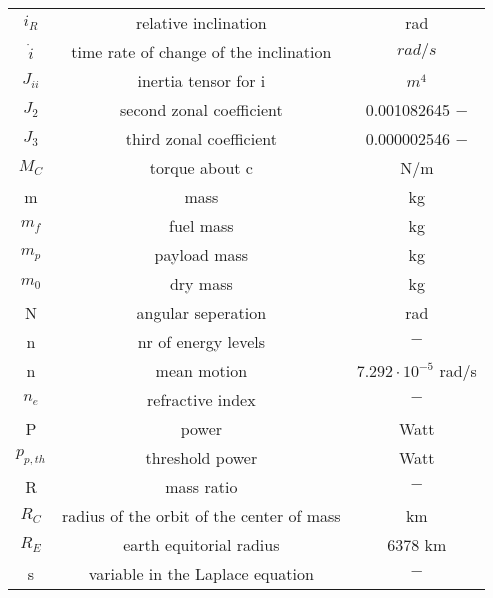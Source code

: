 \begin{longtable}{c|c|c}
        $i_R$ & relative inclination &        rad \\

   $\dot i$ & time rate of change of the inclination &      $rad/s$ \\

       $J_{ii}$ & inertia tensor for i &         $m^4$ \\

        $J_2$ & second zonal coefficient & 0.001082645 $-$ \\

        $J_3$ & third zonal coefficient & 0.000002546 $-$ \\

        $M_C$ & torque about c &        N/m \\

         m &       mass &         kg \\

        $m_f$ &  fuel mass &         kg \\

        $m_p$ & payload mass &         kg \\

        $m_0$ &   dry mass &         kg \\

         N & angular seperation &        rad \\

         n & nr of energy levels &          $-$ \\

         n & mean motion & $7.292\cdot 10^{ - 5}$ rad/s \\

        $n_e$ & refractive index &          $-$ \\

         P &      power &       Watt \\

     $p_{p,th}$ & threshold power &       Watt \\

         R & mass ratio &          $-$ \\

        $R_C$ & radius of the orbit of the center of mass &         km \\

        $R_E$ & earth equitorial radius &    6378 km \\

         s & variable in the Laplace equation &          $-$ \\


\end{longtable}
